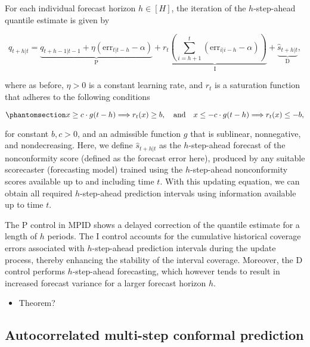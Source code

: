 \documentclass[
  11pt,
  a4paper,
]{article}
\providecommand{\tightlist}{%
  \setlength{\itemsep}{0pt}\setlength{\parskip}{0pt}}\usepackage{longtable,booktabs,array}
\theoremstyle{plain}
\theoremstyle{plain}
\theoremstyle{remark}
\begin{document}
For each individual forecast horizon \(h\in[H]\), the iteration of the
\(h\)-step-ahead quantile estimate is given by

\[
q_{t+h|t}=\underbrace{q_{t+h-1|t-1}+\eta \left(\mathrm{err}_{t|t-h}-\alpha\right)}_{\mathrm{P}}+\underbrace{r_t\left(\sum_{i=h+1}^t \left(\mathrm{err}_{i|i-h}-\alpha\right)\right)}_{\mathrm{I}}+\underbrace{\hat{s}_{t+h|t}}_{\mathrm{D}},
\]

where as before, \(\eta > 0\) is a constant learning rate, and \(r_t\)
is a saturation function that adheres to the following conditions

\begin{equation}\phantomsection\label{eq-saturation_h}{
x \geq c \cdot g(t-h) \Longrightarrow r_t(x) \geq b, \quad \text {and} \quad x \leq-c \cdot g(t-h) \Longrightarrow r_t(x) \leq -b,
}\end{equation}

for constant \(b, c > 0\), and an admissible function \(g\) that is
sublinear, nonnegative, and nondecreasing. Here, we define
\(\hat{s}_{t+h|t}\) as the \(h\)-step-ahead forecast of the
nonconformity score (defined as the forecast error here), produced by
any suitable scorecaster (forecasting model) trained using the
\(h\)-step-ahead nonconformity scores available up to and including time
\(t\). With this updating equation, we can obtain all required
\(h\)-step-ahead prediction intervals using information available up to
time \(t\).

The P control in MPID shows a delayed correction of the quantile
estimate for a length of \(h\) periods. The I control accounts for the
cumulative historical coverage errors associated with \(h\)-step-ahead
prediction intervals during the update process, thereby enhancing the
stability of the interval coverage. Moreover, the D control performs
\(h\)-step-ahead forecasting, which however tends to result in increased
forecast variance for a larger forecast horizon \(h\).

\begin{itemize}
\tightlist
\item
  Theorem?
\end{itemize}

\subsection{Autocorrelated multi-step conformal
prediction}\label{sec-acmcp}
\end{document}
